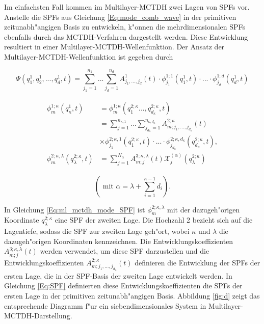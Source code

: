 Im einfachsten Fall kommen im Multilayer-MCTDH zwei Lagen von SPFs vor.
Anstelle die SPFs aus Gleichung \ref{Eq:mode_comb_wave} in der primitiven zeitunabh"angigen Basis zu entwickeln,
k"onnen die mehrdimensionalen SPFs ebenfalls durch das MCTDH-Verfahren dargestellt werden.
Diese Entwicklung resultiert in einer Multilayer-MCTDH-Wellenfunktion. 
Der Ansatz der Multilayer-MCTDH-Wellenfunktion ist gegeben durch 

\begin{equation}
  \Psi(q^{1}_{1},q^{1}_{2},..., q^{1}_{d}, t)=\sum^{n_{1}}_{j_{1}=1} ... \sum^{n_{d}}_{j_{d}=1} A^{1}_{j_{1}, ..., j_{d}}(t)
  \cdot \phi^{1;1}_{j_{1}}(q^1_{1}, t) \cdot ... \cdot \phi^{1;d}_{j_{d}}(q^1_{d}, t)
  \label{Eq:ml_mctdh_wave}
  \end{equation}

\begin{align}
  \begin{split}
 \phi^{1;\kappa}_{m} (q^1_{\kappa}, t) & =  \phi^{1;\kappa}_{m} (q^{2;\kappa}_1..., q^{2;\kappa}_{d_{\kappa}},t)\\
 & = \sum^{n_{\kappa,1}}_{j=1} ... \sum^{n_{\kappa,d_\kappa}}_{j_{d_\kappa}=1} A^{2;\kappa}_{m;j_1,...,j_{d_\kappa}}(t) \\
 & \times \phi^{2;\kappa,1}_{j_1} (q^{2;\kappa}_{1}, t) \cdot ... \cdot
 \phi^{2;\kappa,d_\kappa}_{j_{d_\kappa}} (q^{2;\kappa}_{d_\kappa}, t),
\\
 \phi^{2;\kappa, \lambda}_{m} (q^{2;\kappa}_{\lambda}, t)&= \sum^{N_{\alpha}}_{j=1} A^{3;\kappa, \lambda}_{m;j}(t)
 \mathcal{X}^{(\alpha)}_{j}(q^{2;\kappa}_\lambda)
 \label{Eq:ml_mctdh_mode_SPF}
  \end{split}
 \end{align}

 \begin{equation}
  \left( \text{ mit } \alpha = \lambda + \sum^{\kappa - 1}_{i=1}d_i \right).
 \end{equation}

In Gleichung \ref{Eq:ml_mctdh_mode_SPF} ist $ \phi^{2;\kappa, \lambda}_{m}  $ 
mit der dazugeh"origen Koordinate $q^{2;\kappa}_\lambda$ eine SPF der zwei\-ten Lage.
Die Hochzahl 2 bezieht sich auf die Lagentiefe, sodass die SPF zur zweiten Lage geh"ort, 
wobei $\kappa$ und $\lambda$ die dazugeh"origen Koordinaten kennzeichnen.
Die Ent\-wicklungskoeffizienten $A^{3;\kappa, \lambda}_{m;j}(t) $ werden verwendet, um diese SPF darzustellen
und die Entwicklungskoeffizienten $A^{2;\kappa}_{m;j_1,...,j_{d_\kappa}}(t)$ definieren die Entwicklung der SPFs der ersten Lage, die
in der SPF-Basis der zweiten Lage entwickelt werden.
In Gleichung \ref{Eq:SPF} definier\-ten diese Entwicklungskoeffizienten die SPFs der ersten Lage in der primitiven zeitunabh"angigen Basis.
Abbildung \ref{fig:d} zeigt das entsprechende Diagramm f"ur ein siebendimensionales System in Multilayer-MCTDH-Darstellung.

